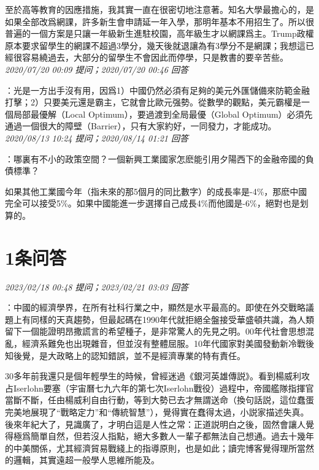 \documentclass[twocolumn]{ctexart}
\begin{document}
至於高等教育的因應措施，我其實一直在很密切地注意著。知名大學最擔心的，是如果全部改爲網課，許多新生會申請延一年入學，那明年基本不用招生了。所以很普遍的一個方案是只讓一年級新生進駐校園，高年級生才以網課爲主。Trump政權原本要求留學生的網課不超過3學分，幾天後就退讓為有3學分不是網課；我想這已經很容易繞過去，大部分的留學生不會因此而停學，只是教書的要辛苦些。
\\

\textit{\hfill\noindent\small 2020/07/20 00:09 提问；2020/07/20 00:46 回答}

：光是一方出手沒有用，因爲1）中國仍然必須有足夠的美元外匯儲備來防範金融打擊；2）只要美元還是霸主，它就會比歐元强勢。從數學的觀點，美元霸權是一個局部最優解（Local Optimum），要過渡到全局最優（Global Optimum）必須先通過一個很大的障壁（Barrier），只有大家約好，一同發力，才能成功。
\\

\textit{\hfill\noindent\small 2020/08/13 10:24 提问；2020/08/14 01:21 回答}

：哪裏有不小的政策空間？一個新興工業國家怎麽能引用夕陽西下的金融帝國的負債標準？

如果其他工業國今年（指未來的那5個月的同比數字）的成長率是-4\%，那麽中國完全可以接受5\%。如果中國能進一步選擇自己成長4\%而他國是-6\%，絕對也是划算的。
\\

\section{1条问答}

\textit{\hfill\noindent\small 2023/02/18 00:48 提问；2023/02/21 03:03 回答}

：中國的經濟學界，在所有社科行業之中，顯然是水平最高的。即使在外交戰略議題上有同樣的天真趨勢，但最起碼在1990年代就拒絕全盤接受華盛頓共識，為人類留下一個能證明昂撒謊言的希望種子，是非常驚人的先見之明。00年代社會思想混亂，經濟系難免也出現雜音，但並沒有整體屈服。10年代國家對美國發動新冷戰後知後覺，是大政略上的認知錯誤，並不是經濟專業的特有責任。

30多年前我還只是個年輕學生的時候，曾經迷過《銀河英雄傳説》。看到楊威利攻占Iserlohn要塞（宇宙曆七九六年的第七次Iserlohn戰役）過程中，帝國艦隊指揮官當斷不斷，任由楊威利自由行動，等到大勢已去才無謂送命（換句話説，這位蠢蛋完美地展現了“戰略定力”和“傳統智慧”），覺得實在蠢得太過，小説家描述失真。後來年紀大了，見識廣了，才明白這是人性之常：正道説明白之後，固然會讓人覺得極爲簡單自然，但若沒人指點，絕大多數人一輩子都無法自己想通。過去十幾年的中美關係，尤其經濟貿易戰綫上的指導原則，也是如此；讀完博客覺得理所當然的邏輯，其實遠超一般學人思維所能及。
\\
\end{document}
